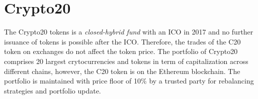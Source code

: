 \section{Crypto20}

The Crypto20 tokens is a  \textit{closed-hybrid fund} \cite{schwartzkopff2017crypto20} with an ICO in 2017 and no further issuance of tokens is possible after the ICO. Therefore, the trades of the C20 token on exchanges do not affect the token price. The portfolio of Crypto20 comprises 20 largest crytocurrencies and tokens in term of capitalization across different chains, however, the C20 token is on the Ethereum blockchain. The portfolio is maintained with price floor of 10\% by a trusted party for rebalancing strategies and portfolio update.